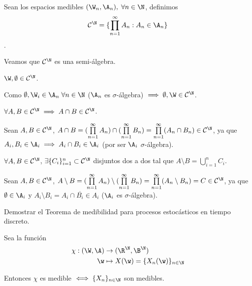 \begin{sol}
  Sean los espacios medibles $(\W_n, \A_n), \; \forall n \in \N$, definimos $$\mathcal{C}^\N = \{\prod \limits^\infty_{n = 1} A_n : A_n \in \A_n \}$$.

  Veamos que $\mathcal{C}^\N$ es una semi-álgebra.
  \begin{nlist}
    \item $\W, \emptyset \in \mathcal{C}^\N$.

    Como $\emptyset, \W_i \in \A_n \; \forall n \in \N$ ($\A_n$ es $\sigma$-álgebra) $\implies \emptyset, \W \in \mathcal{C}^\N$.

    \item $\forall A, B \in \mathcal{C}^\N \implies A \cap B \in \mathcal{C}^\N$.

    Sean $A, B \in \mathcal{C}^\N$, $A \cap B = (\prod \limits^\infty_{n = 1} A_n) \cap (\prod \limits^\infty_{n = 1} B_n) = \prod \limits^\infty_{n = 1} (A_n \cap B_n) \in \mathcal{C}^\N$, ya que $A_i, B_i \in \A_i \implies A_i \cap B_i \in \A_i$ (por ser $\A_i$ $\sigma$-álgebra).

    \item $\forall A, B \in \mathcal{C}^\N$, $\exists \{C_i\}^n_{i = 1} \subset \mathcal{C}^\N$ disjuntos dos a dos tal que $A \setminus B = \bigcup \limits^n_{i = 1} C_i$.

    Sean $A, B \in \mathcal{C}^\N$, $A \setminus B = (\prod \limits^\infty_{n = 1} A_n) \setminus(\prod \limits^\infty_{n = 1} B_n) = \prod \limits^\infty_{n = 1} (A_n \setminus B_n) = C \in \mathcal{C}^\N$, ya que $\emptyset \in \A_i$ y $A_i \setminus B_i = A_i \cap \overline{B_i} \in A_i$ ($\A_i$ es $\sigma$-álgebra).
  \end{nlist}
\end{sol}

\begin{ejer}
  Demostrar el Teorema de medibilidad para procesos estocásticos en tiempo discreto.
\end{ejer}

\begin{sol}
  Sea la función \begin{align*}
    \chi : (\W, \A) & \to (\R^\N, \B^\N) \\
    \w & \mapsto X(\w) = \{X_n(\w)\}_{n \in \N}
  \end{align*}

  Entonces $\chi$ es medible $\iff \{X_n\}_{n \in \N}$ son medibles.
\end{sol}
